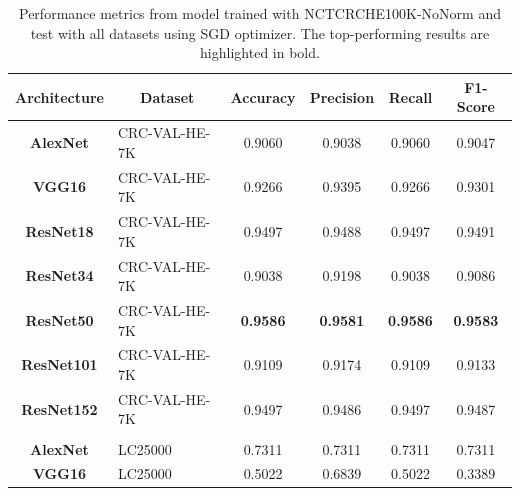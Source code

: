 \begin{table}[t!]
\centering

\caption{Performance metrics from model trained with \gls{NCTCRCHE100K}-NoNorm and test with all datasets using SGD optimizer. The top-performing results are highlighted in bold.}
\label{table_NCTCRCHE100K-nonorm_sgd}

\begin{tabular}{|c|l|c|c|c|c|}
\hline
\textbf{Architecture}  & \multicolumn{1}{c|}{\textbf{Dataset}} & \textbf{Accuracy}          & \textbf{Precision}    & \textbf{Recall}       & \textbf{F1-Score}     \\ \hline
\textbf{AlexNet}       & CRC-VAL-HE-7K                         & 0.9060                & 0.9038                & 0.9060                & 0.9047                \\ \hline
\textbf{VGG16}         & CRC-VAL-HE-7K                         & 0.9266                & 0.9395                & 0.9266                & 0.9301                \\ \hline
\textbf{ResNet18}      & CRC-VAL-HE-7K                         & 0.9497                & 0.9488                & 0.9497                & 0.9491                \\ \hline
\textbf{ResNet34}      & CRC-VAL-HE-7K                         & 0.9038                & 0.9198                & 0.9038                & 0.9086                \\ \hline
\textbf{ResNet50}      & CRC-VAL-HE-7K                         & \textbf{0.9586}                & \textbf{0.9581}                & \textbf{0.9586}                & \textbf{0.9583}                \\ \hline
\textbf{ResNet101}     & CRC-VAL-HE-7K                         & 0.9109                & 0.9174                & 0.9109                & 0.9133                \\ \hline
\textbf{ResNet152}     & CRC-VAL-HE-7K                         & 0.9497                & 0.9486                & 0.9497                & 0.9487                \\ \hline
\multicolumn{1}{|l|}{} &                                       & \multicolumn{1}{l|}{} & \multicolumn{1}{l|}{} & \multicolumn{1}{l|}{} & \multicolumn{1}{l|}{} \\ \hline
\textbf{AlexNet}       & LC25000                               & 0.7311                & 0.7311                & 0.7311                & 0.7311                \\ \hline
\textbf{VGG16}         & LC25000                               & 0.5022                & 0.6839                & 0.5022                & 0.3389                \\ \hline

\end{tabular}
\end{table}
